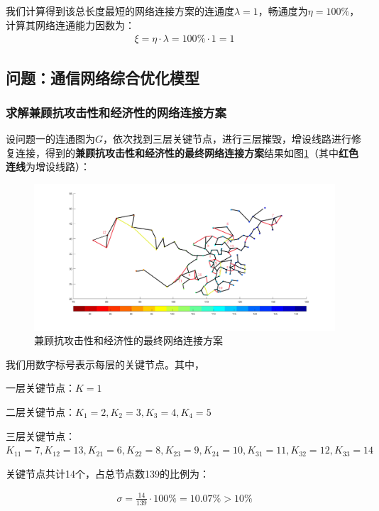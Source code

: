 \documentclass{article}
\begin{document}
我们计算得到该总长度最短的网络连接方案的连通度$\lambda=1$，畅通度为$\eta=100\%$，计算其网络连通能力因数为：
\begin{align}
	\xi=\eta \cdot \lambda=100\% \cdot 1=1
\end{align}

\subsection{问题：通信网络综合优化模型}
\label{ssub:问题\chinese{subsection}：通信网络综合优化模型}

\subsubsection{求解兼顾抗攻击性和经济性的网络连接方案}
\label{求解兼顾抗攻击性和经济性的网络连接方案}
设问题一的连通图为$G$，依次找到三层关键节点，进行三层摧毁，增设线路进行修复连接，得到的\textbf{兼顾抗攻击性和经济性的最终网络连接方案}结果如图\ref{fig:兼顾抗攻击性和经济性的最终网络连接方案}（其中\textbf{红色连线}为增设线路）：

\begin{figure}[htpb]
	\centering
	\includegraphics[width=0.8\linewidth]{43.png}
	\caption{兼顾抗攻击性和经济性的最终网络连接方案}
	\label{fig:兼顾抗攻击性和经济性的最终网络连接方案}
\end{figure}

我们用数字标号表示每层的关键节点。其中，

一层关键节点：$K=1$

二层关键节点：$K_1=2,K_2=3,K_3=4,K_4=5$

三层关键节点：$K_{11}=7,K_{12}=13,K_{21}=6,K_{22}=8,K_{23}=9,K_{24}=10,K_{31}=11,K_{32}=12,K_{33}=14$

关键节点共计14个，占总节点数139的比例为：

\begin{align}
	\sigma=\frac{14}{139}\cdot 100\%=10.07\%>10\%
\end{align}
\end{document}
